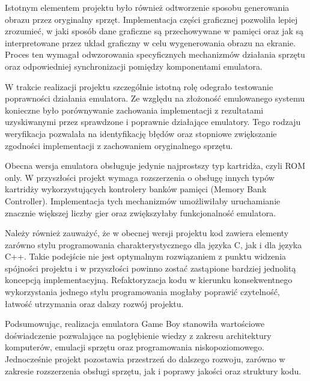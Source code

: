 \documentclass{article}
\begin{document}
Istotnym elementem projektu było również odtworzenie sposobu generowania obrazu przez oryginalny sprzęt. Implementacja części graficznej pozwoliła lepiej zrozumieć, w jaki sposób dane graficzne są przechowywane w pamięci oraz jak są interpretowane przez układ graficzny w celu wygenerowania obrazu na ekranie. Proces ten wymagał odwzorowania specyficznych mechanizmów działania sprzętu oraz odpowiedniej synchronizacji pomiędzy komponentami emulatora.

W trakcie realizacji projektu szczególnie istotną rolę odegrało testowanie poprawności działania emulatora. Ze względu na złożoność emulowanego systemu konieczne było porównywanie zachowania implementacji z rezultatami uzyskiwanymi przez sprawdzone i poprawnie działające emulatory. Tego rodzaju weryfikacja pozwalała na identyfikację błędów oraz stopniowe zwiększanie zgodności implementacji z zachowaniem oryginalnego sprzętu.

Obecna wersja emulatora obsługuje jedynie najprostszy typ kartridża, czyli ROM only. W przyszłości projekt wymaga rozszerzenia o obsługę innych typów kartridży wykorzystujących kontrolery banków pamięci (Memory Bank Controller). Implementacja tych mechanizmów umożliwiłaby uruchamianie znacznie większej liczby gier oraz zwiększyłaby funkcjonalność emulatora.

Należy również zauważyć, że w obecnej wersji projektu kod zawiera elementy zarówno stylu programowania charakterystycznego dla języka C, jak i dla języka C++. Takie podejście nie jest optymalnym rozwiązaniem z punktu widzenia spójności projektu i w przyszłości powinno zostać zastąpione bardziej jednolitą koncepcją implementacyjną. Refaktoryzacja kodu w kierunku konsekwentnego wykorzystania jednego stylu programowania mogłaby poprawić czytelność, łatwość utrzymania oraz dalszy rozwój projektu.

Podsumowując, realizacja emulatora Game Boy stanowiła wartościowe doświadczenie pozwalające na pogłębienie wiedzy z zakresu architektury komputerów, emulacji sprzętu oraz programowania niskopoziomowego. Jednocześnie projekt pozostawia przestrzeń do dalszego rozwoju, zarówno w zakresie rozszerzenia obsługi sprzętu, jak i poprawy jakości oraz struktury kodu.

\newpage
\printbibliography
\end{document}
